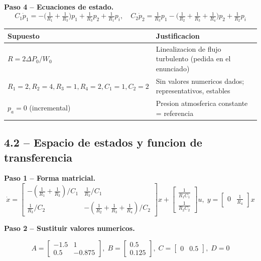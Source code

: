 \documentclass[11pt]{article}
\begin{document}
\textbf{Paso 4 -- Ecuaciones de estado.}
\begin{equation}
C_1\dot p_1=-\Big(\tfrac1{R_1}+\tfrac1{R_3}\Big)p_1+\tfrac1{R_3}p_2+\tfrac1{R_1}p_i,
\quad
C_2\dot p_2=\tfrac1{R_3}p_1-\Big(\tfrac1{R_2}+\tfrac1{R_3}+\tfrac1{R_4}\Big)p_2+\tfrac1{R_2}p_i
\end{equation}

\begin{center}
\begin{tabular}{@{}ll@{}}
\toprule
Supuesto & Justificacion \\
\midrule
$R=2\Delta P_0/W_0$ & Linealizacion de flujo turbulento (pedida en el enunciado) \\
$R_1{=}2,R_2{=}4,R_3{=}1,R_4{=}2,C_1{=}1,C_2{=}2$ & Sin valores numericos dados; representativos, estables \\
$p_a=0$ (incremental) & Presion atmosferica constante = referencia \\
\bottomrule
\end{tabular}
\end{center}

\subsection{4.2 -- Espacio de estados y funcion de transferencia}

\textbf{Paso 1 -- Forma matricial.}
\begin{equation}
\dot x=\begin{bmatrix}-(\tfrac1{R_1}+\tfrac1{R_3})/C_1 & \tfrac1{R_3}/C_1\\[2pt]
\tfrac1{R_3}/C_2 & -(\tfrac1{R_2}+\tfrac1{R_3}+\tfrac1{R_4})/C_2\end{bmatrix}x
+\begin{bmatrix}\tfrac1{R_1C_1}\\[2pt]\tfrac1{R_2C_2}\end{bmatrix}u,\;
y=\begin{bmatrix}0&\tfrac1{R_4}\end{bmatrix}x
\end{equation}

\textbf{Paso 2 -- Sustituir valores numericos.}
\begin{resultbox}
\begin{equation}
A=\begin{bmatrix}-1.5&1\\0.5&-0.875\end{bmatrix},\;
B=\begin{bmatrix}0.5\\0.125\end{bmatrix},\;
C=\begin{bmatrix}0&0.5\end{bmatrix},\; D=0
\label{eq:sys4-abcd}
\end{equation}
\end{resultbox}
\end{document}
